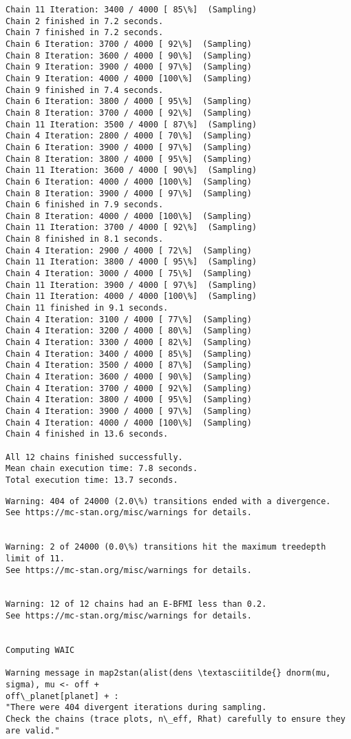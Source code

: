 \documentclass[11pt]{article}
\begin{document}
\begin{Verbatim}[commandchars=\\\{\}]
Chain 11 Iteration: 3400 / 4000 [ 85\%]  (Sampling)
Chain 2 finished in 7.2 seconds.
Chain 7 finished in 7.2 seconds.
Chain 6 Iteration: 3700 / 4000 [ 92\%]  (Sampling)
Chain 8 Iteration: 3600 / 4000 [ 90\%]  (Sampling)
Chain 9 Iteration: 3900 / 4000 [ 97\%]  (Sampling)
Chain 9 Iteration: 4000 / 4000 [100\%]  (Sampling)
Chain 9 finished in 7.4 seconds.
Chain 6 Iteration: 3800 / 4000 [ 95\%]  (Sampling)
Chain 8 Iteration: 3700 / 4000 [ 92\%]  (Sampling)
Chain 11 Iteration: 3500 / 4000 [ 87\%]  (Sampling)
Chain 4 Iteration: 2800 / 4000 [ 70\%]  (Sampling)
Chain 6 Iteration: 3900 / 4000 [ 97\%]  (Sampling)
Chain 8 Iteration: 3800 / 4000 [ 95\%]  (Sampling)
Chain 11 Iteration: 3600 / 4000 [ 90\%]  (Sampling)
Chain 6 Iteration: 4000 / 4000 [100\%]  (Sampling)
Chain 8 Iteration: 3900 / 4000 [ 97\%]  (Sampling)
Chain 6 finished in 7.9 seconds.
Chain 8 Iteration: 4000 / 4000 [100\%]  (Sampling)
Chain 11 Iteration: 3700 / 4000 [ 92\%]  (Sampling)
Chain 8 finished in 8.1 seconds.
Chain 4 Iteration: 2900 / 4000 [ 72\%]  (Sampling)
Chain 11 Iteration: 3800 / 4000 [ 95\%]  (Sampling)
Chain 4 Iteration: 3000 / 4000 [ 75\%]  (Sampling)
Chain 11 Iteration: 3900 / 4000 [ 97\%]  (Sampling)
Chain 11 Iteration: 4000 / 4000 [100\%]  (Sampling)
Chain 11 finished in 9.1 seconds.
Chain 4 Iteration: 3100 / 4000 [ 77\%]  (Sampling)
Chain 4 Iteration: 3200 / 4000 [ 80\%]  (Sampling)
Chain 4 Iteration: 3300 / 4000 [ 82\%]  (Sampling)
Chain 4 Iteration: 3400 / 4000 [ 85\%]  (Sampling)
Chain 4 Iteration: 3500 / 4000 [ 87\%]  (Sampling)
Chain 4 Iteration: 3600 / 4000 [ 90\%]  (Sampling)
Chain 4 Iteration: 3700 / 4000 [ 92\%]  (Sampling)
Chain 4 Iteration: 3800 / 4000 [ 95\%]  (Sampling)
Chain 4 Iteration: 3900 / 4000 [ 97\%]  (Sampling)
Chain 4 Iteration: 4000 / 4000 [100\%]  (Sampling)
Chain 4 finished in 13.6 seconds.

All 12 chains finished successfully.
Mean chain execution time: 7.8 seconds.
Total execution time: 13.7 seconds.

    \end{Verbatim}

    \begin{Verbatim}[commandchars=\\\{\}]
Warning: 404 of 24000 (2.0\%) transitions ended with a divergence.
See https://mc-stan.org/misc/warnings for details.


Warning: 2 of 24000 (0.0\%) transitions hit the maximum treedepth limit of 11.
See https://mc-stan.org/misc/warnings for details.


Warning: 12 of 12 chains had an E-BFMI less than 0.2.
See https://mc-stan.org/misc/warnings for details.


Computing WAIC

Warning message in map2stan(alist(dens \textasciitilde{} dnorm(mu, sigma), mu <- off +
off\_planet[planet] + :
"There were 404 divergent iterations during sampling.
Check the chains (trace plots, n\_eff, Rhat) carefully to ensure they are valid."
    \end{Verbatim}
\end{document}
